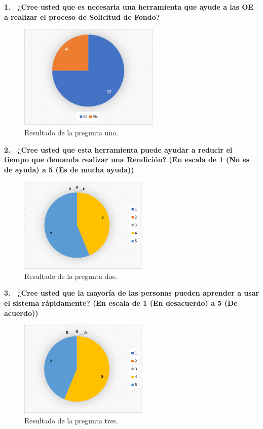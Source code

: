 \textbf{1.  ¿Cree usted que es necesaria una herramienta que ayude a las OE a realizar el proceso de Solicitud de Fondo?}

    \begin{figure}[h!]
        \centering
        \includegraphics[width=0.6\textwidth]{Imagenes/Pregunta1.1.png}
        \caption{\label{fig: Pregunta1}Resultado de la pregunta uno.}
    \end{figure}
\newpage
\textbf{2.  ¿Cree usted que esta herramienta puede ayudar a reducir el tiempo que demanda realizar una Rendición? (En escala de 1 (No es de ayuda) a 5 (Es de mucha ayuda))}

\begin{figure}[h!]
    \centering
    \includegraphics[width=0.55\textwidth]{Imagenes/Pregunta2.1.png}
    \caption{\label{fig: Pregunta2}Resultado de la pregunta dos.}
\end{figure}

\textbf{3.  ¿Cree usted que la mayoría de las personas pueden aprender a usar el sistema rápidamente? (En escala de 1 (En desacuerdo) a 5 (De acuerdo))}

\begin{figure}[h!]
    \centering
    \includegraphics[width=0.55\textwidth]{Imagenes/Pregunta3.1.png}
    \caption{\label{fig: Pregunta3}Resultado de la pregunta tres.}
\end{figure}


